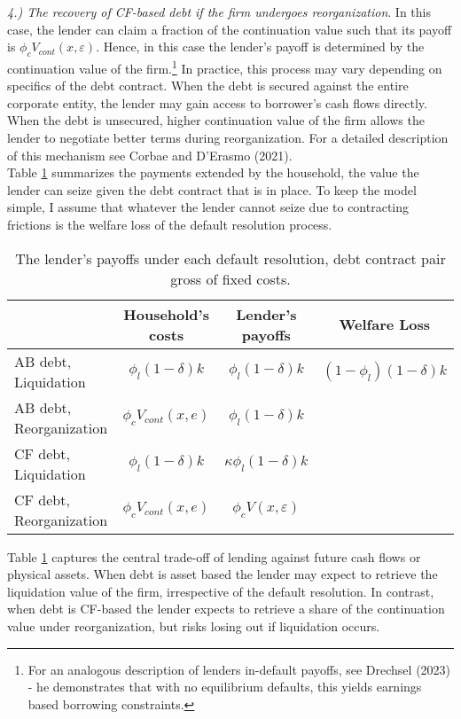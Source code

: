 \documentclass[12pt]{article}
\begin{document}
\textit{ 4.) The recovery of CF-based debt if the firm undergoes reorganization}. In this case, the lender can claim a fraction of the continuation value such that its payoff is $\phi_c V_{cont}(x,\varepsilon)$. Hence, in this case the lender's payoff is determined by the continuation value of the firm.\footnote{For an analogous description of lenders in-default payoffs, see Drechsel (2023) - he demonstrates that with no equilibrium defaults, this yields earnings based borrowing constraints.} In practice, this process may vary depending on specifics of the debt contract. When the debt is secured against the entire corporate entity, the lender may gain access to borrower's cash flows directly. When the debt is unsecured, higher continuation value of the firm allows the lender to negotiate better terms during reorganization. For a detailed description of this mechanism see Corbae and D'Erasmo (2021). \vspace{3mm} \\
Table \ref{tab:lender payoffs} summarizes the payments extended by the household, the value the lender can seize given the debt contract that is in place. To keep the model simple, I assume that whatever the lender cannot seize due to contracting frictions is the welfare loss of the default resolution process. 
\begin{table}[h!]
    \centering
    \begin{tabular}{lccc}
         & Household's costs & Lender's payoffs & Welfare Loss \\
       \midrule
      AB debt, Liquidation & $ \phi_l (1-\delta) k$ &  $ \phi_l (1-\delta) k$ &  $ (1-\phi_l) (1-\delta) k$ \\
      AB debt, Reorganization &   $\phi_cV_{cont}(x,e)$  &  $ \phi_l (1-\delta) k$ &   \\
      CF debt, Liquidation & $ \phi_l (1-\delta) k$ &  $ \kappa \phi_l (1-\delta) k$ &   \\
      CF debt, Reorganization & $\phi_cV_{cont}(x,e)$ & $ \phi_c V(x,\varepsilon)$ &  \\ 
     \bottomrule
     \end{tabular}
    \caption{\small The lender's payoffs under each default resolution, debt contract pair gross of fixed costs.} 
    \label{tab:lender payoffs}
\end{table}

\noindent Table \ref{tab:lender payoffs} captures the central trade-off of lending against future cash flows or physical assets. When debt is asset based the lender may expect to retrieve the liquidation value of the firm, irrespective of the default resolution. In contrast, when debt is CF-based the lender expects to retrieve a share of the continuation value under reorganization, but risks losing out if liquidation occurs.
\end{document}
